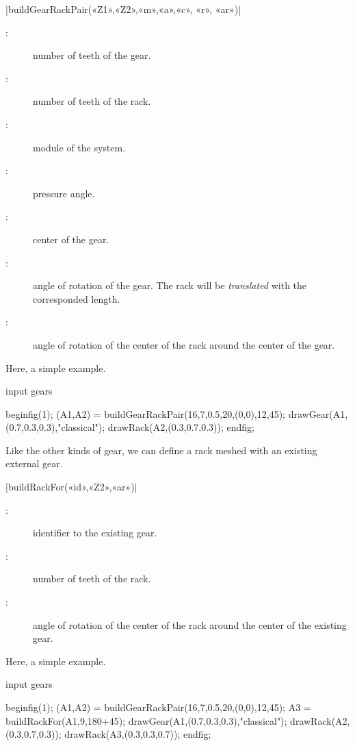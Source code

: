 \documentclass[english]{ltxdoc}
\begin{document}
\begin{colourband}
\commande|buildGearRackPair(«Z1»,«Z2»,«m»,«a»,«c», «r», «ar»)|\smallskip{}

\begin{description}
  \item[:]  number of teeth of the  gear.
  \item[:]  number of teeth of the rack.
  \item[:]  module of the system.
  \item[:]  pressure angle.
  \item[:]  center of the gear.
  \item[:]  angle of rotation of the gear.
  The rack will be \emph{translated} with the corresponded length. 
  \item[:]  angle of rotation of the center
  of the rack around the center of the gear.
\end{description}
\end{colourband}

Here, a simple example.
\begin{ExempleMP}
input gears

beginfig(1);
(A1,A2) = buildGearRackPair(16,7,0.5,20,(0,0),12,45);
drawGear(A1,(0.7,0.3,0.3),"classical");
drawRack(A2,(0.3,0.7,0.3));
endfig;
\end{ExempleMP}

Like the other kinds of gear, we can define a rack meshed with an existing
external gear. 

\begin{colourband}
\commande|buildRackFor(«id»,«Z2»,«ar»)|\smallskip{}
\begin{description}
  \item[:]  identifier to the existing gear.
  \item[:]  number of teeth of the rack.
  \item[:]  angle of rotation of the center
  of the rack around the center of the existing gear.
\end{description}
\end{colourband}


Here, a simple example.
\begin{ExempleMP}
input gears

beginfig(1);
(A1,A2) = buildGearRackPair(16,7,0.5,20,(0,0),12,45);
A3 = buildRackFor(A1,9,180+45);
drawGear(A1,(0.7,0.3,0.3),"classical");
drawRack(A2,(0.3,0.7,0.3));
drawRack(A3,(0.3,0.3,0.7));
endfig;
\end{ExempleMP}
\end{document}
